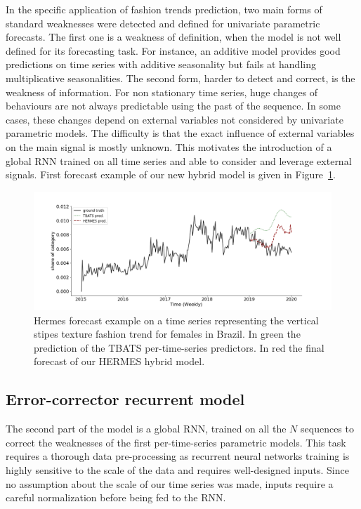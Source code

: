 \documentclass[review]{elsarticle}
\begin{document}
In the specific application of fashion trends prediction, two main forms of standard weaknesses were detected and defined for univariate parametric forecasts. The first one is a weakness of definition, when the model is not well defined for its forecasting task. For instance, an additive model provides good predictions on time series with additive seasonality but fails at handling multiplicative seasonalities. The second form, harder to detect and correct, is the weakness of information. For non stationary time series, huge changes of behaviours are not always predictable using the past of the sequence. In some cases, these changes depend on external variables not considered by univariate parametric models. The difficulty is that the exact influence of external variables on the main signal is mostly unknown. This motivates the introduction of a global RNN trained on all time series and able to consider and leverage external signals. First forecast example of our new hybrid model is given in Figure~\ref{fig:introexamples}.


\begin{figure}
\centering
  \includegraphics[width=\linewidth]{br_female_texture_verticalstripe}
\caption{Hermes forecast example on a time series representing the vertical stipes texture fashion trend for females in Brazil. In green the prediction of the TBATS per-time-series predictors. In red the final forecast of our HERMES hybrid model.}
\label{fig:introexamples}
\end{figure}

\subsection{Error-corrector recurrent model}

The second part of the model is a global RNN, trained on all the $N$ sequences to correct the weaknesses of the first per-time-series parametric models. This task requires a thorough data pre-processing as recurrent neural networks training is highly sensitive to the scale of the data and requires well-designed inputs. Since no assumption about the scale of our time series was made, inputs require a careful normalization before being fed to the RNN.
\end{document}
